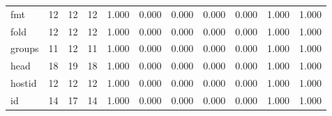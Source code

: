 \begin{longtable}{lp{1.2cm}p{1.2cm}p{1.2cm}p{1.2cm}p{1.2cm}p{1.2cm}p{1.2cm}p{1.2cm}p{1.2cm}p{1.2cm}}
fmt       &                           12 &                 12 &                                12 &                                      1.000 &                                  0.000 &                                        0.000 &                             0.000 &                                   0.000 &                              1.000 &                                              1.000 \\
fold      &                           12 &                 12 &                                12 &                                      1.000 &                                  0.000 &                                        0.000 &                             0.000 &                                   0.000 &                              1.000 &                                              1.000 \\
groups    &                           11 &                 12 &                                11 &                                      1.000 &                                  0.000 &                                        0.000 &                             0.000 &                                   0.000 &                              1.000 &                                              1.000 \\
head      &                           18 &                 19 &                                18 &                                      1.000 &                                  0.000 &                                        0.000 &                             0.000 &                                   0.000 &                              1.000 &                                              1.000 \\
hostid    &                           12 &                 12 &                                12 &                                      1.000 &                                  0.000 &                                        0.000 &                             0.000 &                                   0.000 &                              1.000 &                                              1.000 \\
id        &                           14 &                 17 &                                14 &                                      1.000 &                                  0.000 &                                        0.000 &                             0.000 &                                   0.000 &                              1.000 &                                              1.000 \\

\end{longtable}

